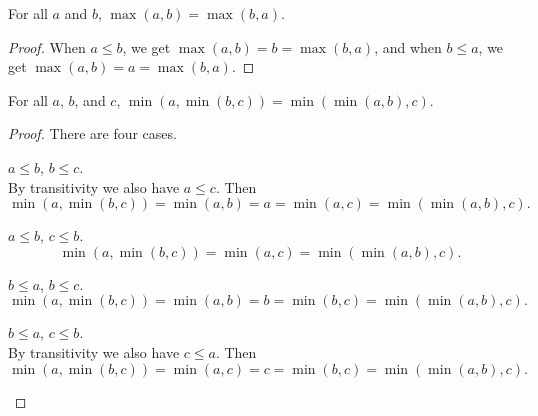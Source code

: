 \documentclass[../../math.tex]{subfiles}
\begin{document}
\begin{theorem} \label{max_comm}
    For all $a$ and $b$, $\max(a, b) = \max(b, a)$.
\end{theorem}
\begin{proof}
    When $a \leq b$, we get $\max(a, b) = b = \max(b, a)$, and when $b \leq a$,
    we get $\max(a, b) = a = \max(b, a)$.
\end{proof}

\begin{theorem}
    For all $a$, $b$, and $c$, $\min(a, \min(b, c)) = \min(\min(a, b), c)$.
\end{theorem}
\begin{proof}
    There are four cases.
    \begin{case} $a \leq b$, $b \leq c$. \\
        By transitivity we also have $a \leq c$.  Then
        \[
            \min(a, \min(b, c)) = \min(a, b) =
            a
            = \min(a, c) = \min(\min(a, b), c).
        \]
    \end{case}
    \begin{case} $a \leq b$, $c \leq b$.
        \[
            \min(a, \min(b, c)) =
            \min(a, c)
            = \min(\min(a, b), c).
        \]
    \end{case}
    \begin{case} $b \leq a$, $b \leq c$.
        \[
            \min(a, \min(b, c)) = \min(a, b) =
            b
            = \min(b, c) = \min(\min(a, b), c).
        \]
    \end{case}
    \begin{case} $b \leq a$, $c \leq b$. \\
        By transitivity we also have $c \leq a$.  Then
        \[
            \min(a, \min(b, c)) = \min(a, c) =
            c
            = \min(b, c) = \min(\min(a, b), c).
        \]
    \end{case}
\end{proof}
\end{document}
